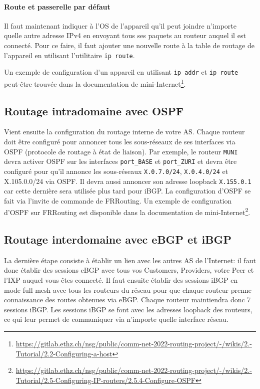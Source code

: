 \documentclass[a4paper, 11pt]{article}
\begin{document}
\paragraph*{Route et passerelle par défaut}
Il faut maintenant indiquer à l'OS de l'appareil qu'il peut joindre
n'importe quelle autre adresse IPv4 en envoyant tous ses paquets
au routeur auquel il est connecté. Pour ce faire, il faut ajouter une
nouvelle route à la table de routage de l'appareil en utilisant
l'utilitaire \texttt{ip route}.

Un exemple de configuration d'un appareil en utilisant
\texttt{ip addr} et \texttt{ip route} peut-être trouvée dans la documentation
de mini-Internet\footnote{\url{https://gitlab.ethz.ch/nsg/public/comm-net-2022-routing-project/-/wikis/2.-Tutorial/2.2-Configuring-a-host}}.

\subsection{Routage intradomaine avec OSPF}

Vient ensuite la configuration du routage interne de votre AS.
Chaque routeur doit être configuré pour annoncer tous
les sous-réseaux de ses interfaces
via OSPF (protocole de routage à état de liaison).
Par exemple, le routeur \texttt{MUNI} devra activer
OSPF sur les interfaces \texttt{port\_BASE} et \texttt{port\_ZURI}
et devra être configuré
pour qu'il annonce les sous-réseaux \texttt{X.0.7.0/24},
\texttt{X.0.4.0/24} et X.105.0.0/24 via OSPF.
Il devra aussi annoncer son adresse loopback \texttt{X.155.0.1}
car cette dernière sera utilisée plus tard pour iBGP.
La configuration d'OSPF se fait via l'invite de commande de
FRRouting. Un exemple de configuration d'OSPF sur FRRouting
est disponible dans la documentation de
mini-Internet\footnote{\url{https://gitlab.ethz.ch/nsg/public/comm-net-2022-routing-project/-/wikis/2.-Tutorial/2.5-Configuring-IP-routers/2.5.4-Configure-OSPF}}.


\subsection{Routage interdomaine avec eBGP et iBGP}

La dernière étape consiste à établir un lien avec les autres AS
de l'Internet: il faut donc établir des sessions eBGP avec tous vos
Customers, Providers, votre Peer et l'IXP auquel vous êtes connecté.
Il faut ensuite établir des sessions iBGP en mode full-mesh avec 
tous les routeurs du réseau pour que chaque routeur prenne connaissance
des routes obtenues via eBGP. Chaque routeur maintiendra donc
7 sessions iBGP. Les sessions iBGP se font avec les adresses loopback
des routeurs, ce qui leur permet de communiquer via n'importe quelle
interface réseau.
\end{document}
